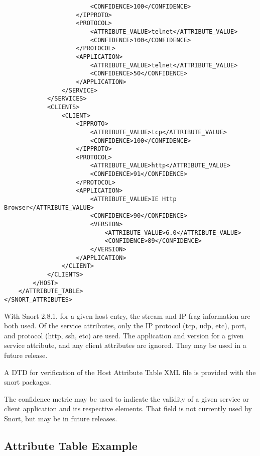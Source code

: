\documentclass[english]{report}
\newenvironment{note}{
\samepage
    \vspace{10pt}{\textsf{
        {\hspace{7pt}\Huge{$\triangle$\hspace{-12.5pt}{\Large{$^!$}}}}\hspace{5pt}
        {\Large{NOTE}}
    }
    }
   \begin{center}
    \par\vspace{-17pt}

    \begin{lrbox}{\savepar}
    \begin{minipage}[r]{6in}
}
{
    \end{minipage}
    \end{lrbox}
    \fbox{
        \usebox{
            \savepar
	}
    }
    \par\vskip10pt
    \end{center}
}
\newenvironment{note}{
        \begin{rawhtml}
        <p><table border="1"><tr><td><b>
        Note:&nbsp;&nbsp;</b>
        \end{rawhtml}
}{
        \begin{rawhtml}
        </b></td></tr></table></p>
        \end{rawhtml}
}
\begin{document}
\begin{verbatim}
                        <CONFIDENCE>100</CONFIDENCE>
                    </IPPROTO>
                    <PROTOCOL>
                        <ATTRIBUTE_VALUE>telnet</ATTRIBUTE_VALUE>
                        <CONFIDENCE>100</CONFIDENCE>
                    </PROTOCOL>
                    <APPLICATION>
                        <ATTRIBUTE_VALUE>telnet</ATTRIBUTE_VALUE>
                        <CONFIDENCE>50</CONFIDENCE>
                    </APPLICATION>
                </SERVICE>
            </SERVICES>
            <CLIENTS>
                <CLIENT>
                    <IPPROTO>
                        <ATTRIBUTE_VALUE>tcp</ATTRIBUTE_VALUE>
                        <CONFIDENCE>100</CONFIDENCE>
                    </IPPROTO>
                    <PROTOCOL>
                        <ATTRIBUTE_VALUE>http</ATTRIBUTE_VALUE>
                        <CONFIDENCE>91</CONFIDENCE>
                    </PROTOCOL>
                    <APPLICATION>
                        <ATTRIBUTE_VALUE>IE Http Browser</ATTRIBUTE_VALUE>
                        <CONFIDENCE>90</CONFIDENCE>
                        <VERSION>
                            <ATTRIBUTE_VALUE>6.0</ATTRIBUTE_VALUE>
                            <CONFIDENCE>89</CONFIDENCE>
                        </VERSION>
                    </APPLICATION>
                </CLIENT>
            </CLIENTS>
        </HOST>
    </ATTRIBUTE_TABLE>
</SNORT_ATTRIBUTES>
\end{verbatim}

\begin{note}

With Snort 2.8.1, for a given host entry, the stream and IP frag information
are both used.  Of the service attributes, only the IP protocol (tcp, udp,
etc), port, and protocol (http, ssh, etc) are used.  The application and
version for a given service attribute, and any client attributes are ignored.
They may be used in a future release.

\end{note}

A DTD for verification of the Host Attribute Table XML file is provided with
the snort packages.

The confidence metric may be used to indicate the validity of a given service
or client application and its respective elements.  That field is not
currently used by Snort, but may be in future releases.

\subsection{Attribute Table Example}
\end{document}
